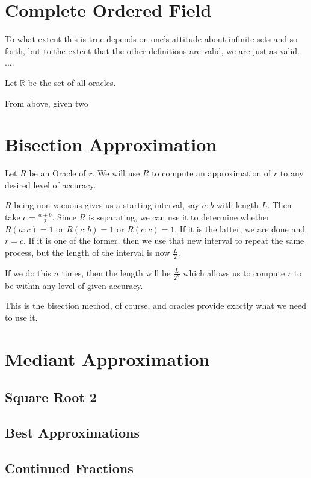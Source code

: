 \documentclass[12pt]{article}
\theoremstyle{remark}
\begin{document}
\section{Complete Ordered Field}

To what extent this is true depends on one's attitude about infinite sets and so forth, but to the extent that the other definitions are valid, we are just as valid. ....

Let $\mathbb{R}$ be the set of all oracles. 

From above, given two 

\section{Bisection Approximation}

Let $R$ be an Oracle of $r$. We will use $R$ to compute an approximation of $r$ to any desired level of accuracy.

$R$ being non-vacuous gives us a starting interval, say $a:b$ with length $L$. Then take $c = \frac{a+b}{2}$. Since $R$ is separating, we can use it to determine whether $R(a:c) = 1$ or $R(c:b) = 1$ or $R(c:c) = 1$. If it is the latter, we are done and $r = c$. If it is one of the former, then we use that new interval to repeat the same process, but the length of the interval is now $\frac{L}{2}$. 

If we do this $n$ times, then the length will be $\frac{L}{2^n}$ which allows us to compute $r$ to be within any level of given accuracy. 

This is the bisection method, of course, and oracles provide exactly what we need to use it. 

\section{Mediant Approximation}

\subsection{Square Root 2}

\subsection{Best Approximations}

\subsection{Continued Fractions}
\end{document}

